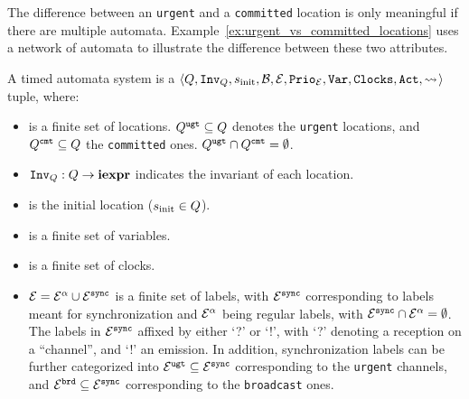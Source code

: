 The difference between an \texttt{urgent} and a \texttt{committed} location is
only meaningful if there are multiple automata.
Example~\ref{ex:urgent_vs_committed_locations} uses a network of automata to
illustrate the difference between these two attributes.

\begin{definition}
A timed automata system \automatasystem{} is a
$\langle Q{}, \allowbreak{}
\text{\texttt{Inv}\textsubscript{\ensuremath{Q}{}}}{}, \allowbreak{}
s_{\text{init}}{}, \allowbreak{}
\mathcal{B}{}, \allowbreak{}
\mathcal{E}{}, \allowbreak{}
\text{\texttt{Prio}\textsubscript{\ensuremath{\mathcal{E}}}}{}, \allowbreak{}
\text{\texttt{Var}}{}, \allowbreak{}
\text{\texttt{Clocks}}{}, \allowbreak{}
\text{\texttt{Act}}{}, \allowbreak{}
{\rightsquigarrow{}\!}{}\rangle$ tuple, where:
\begin{itemize}
\item \automatastates{} is a finite set of locations.
   $Q{}^{\texttt{ugt}} \subseteq Q{}$
   denotes the \texttt{urgent} locations, and
   $Q{}^{\texttt{cmt}} \subseteq Q{}$
   the \texttt{committed} ones.
   $Q{}^{\texttt{ugt}} \cap Q{}^{\texttt{cmt}} = \emptyset$.
\item
   $\text{\texttt{Inv}\textsubscript{\ensuremath{Q}{}}}{} : Q{} \to \textbf{iexpr}$ indicates
   the invariant of each location.
\item \automatainit{} is the initial location ($s_{\text{init}}{} \in
Q{}$).
\item \automatavariables{} is a finite set of variables.
\item \automataclocks{} is a finite set of clocks.
\item
   $\mathcal{E}{} = \mathcal{E}{}^{\alpha} \cup
   \mathcal{E}{}^{\texttt{sync}}$ is a finite set of labels, with
   $\mathcal{E}{}^{\texttt{sync}}$ corresponding to labels meant for
   synchronization and $\mathcal{E}{}^{\alpha}$ being regular labels,
   with
   $\mathcal{E}{}^{\texttt{sync}} \cap \mathcal{E}{}^{\alpha}
   = \emptyset$.
   The labels in $\mathcal{E}{}^{\texttt{sync}}$ affixed by either `?'
   or `!', with `?' denoting a reception on a ``channel'', and `!' an emission.
   In addition, synchronization labels can be further categorized
   into $\mathcal{E}{}^{\texttt{ugt}}{} \subseteq \mathcal{E}{}^{\texttt{sync}}$
   corresponding to the \texttt{urgent} channels, and
   $\mathcal{E}{}^{\texttt{brd}}{} \subseteq \mathcal{E}{}^{\texttt{sync}}$
   corresponding to the \texttt{broadcast} ones.

\end{itemize}
\end{definition}
